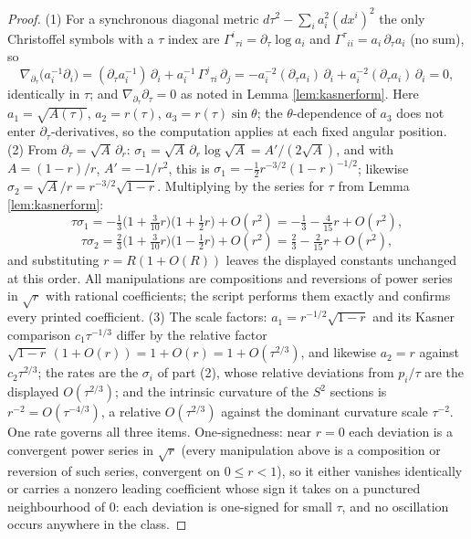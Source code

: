 \documentclass[11pt]{article}
\theoremstyle{definition}
\begin{document}
\begin{proof}
(1) For a synchronous diagonal metric $d\tau^2 - \sum_i a_i^2 (dx^i)^2$ the only Christoffel symbols with a $\tau$ index are $\Gamma^i{}_{\tau i} = \partial_\tau \log a_i$ and $\Gamma^\tau{}_{ii} = a_i\,\partial_\tau a_i$ (no sum), so
\[
\nabla_{\partial_\tau}\bigl(a_i^{-1}\partial_i\bigr)
= (\partial_\tau a_i^{-1})\,\partial_i + a_i^{-1}\,\Gamma^j{}_{\tau i}\,\partial_j
= -a_i^{-2}(\partial_\tau a_i)\,\partial_i + a_i^{-2}(\partial_\tau a_i)\,\partial_i = 0 ,
\]
identically in $\tau$; and $\nabla_{\partial_\tau}\partial_\tau = 0$ as noted in Lemma \ref{lem:kasnerform}. Here $a_1 = \sqrt{A(\tau)}$, $a_2 = r(\tau)$, $a_3 = r(\tau)\sin\theta$; the $\theta$-dependence of $a_3$ does not enter $\partial_\tau$-derivatives, so the computation applies at each fixed angular position. (2) From $\partial_\tau = \sqrt{A}\,\partial_r$: $\sigma_1 = \sqrt A\,\partial_r \log\sqrt A = A'/(2\sqrt A)$, and with $A = (1-r)/r$, $A' = -1/r^2$, this is $\sigma_1 = -\tfrac12 r^{-3/2}(1-r)^{-1/2}$; likewise $\sigma_2 = \sqrt A / r = r^{-3/2}\sqrt{1-r}$. Multiplying by the series for $\tau$ from Lemma \ref{lem:kasnerform}:
\[
\tau\sigma_1 = -\tfrac13\bigl(1 + \tfrac{3}{10}r\bigr)\bigl(1 + \tfrac12 r\bigr) + O(r^2) = -\tfrac13 - \tfrac{4}{15}r + O(r^2),
\]
\[
\tau\sigma_2 = \tfrac23\bigl(1 + \tfrac{3}{10}r\bigr)\bigl(1 - \tfrac12 r\bigr) + O(r^2) = \tfrac23 - \tfrac{2}{15}r + O(r^2),
\]
and substituting $r = R(1 + O(R))$ leaves the displayed constants unchanged at this order. All manipulations are compositions and reversions of power series in $\sqrt r$ with rational coefficients; the script performs them exactly and confirms every printed coefficient. (3) The scale factors: $a_1 = r^{-1/2}\sqrt{1-r}$ and its Kasner comparison $c_1\tau^{-1/3}$ differ by the relative factor $\sqrt{1-r}\,(1 + O(r)) = 1 + O(r) = 1 + O(\tau^{2/3})$, and likewise $a_2 = r$ against $c_2\tau^{2/3}$; the rates are the $\sigma_i$ of part (2), whose relative deviations from $p_i/\tau$ are the displayed $O(\tau^{2/3})$; and the intrinsic curvature of the $S^2$ sections is $r^{-2} = O(\tau^{-4/3})$, a relative $O(\tau^{2/3})$ against the dominant curvature scale $\tau^{-2}$. One rate governs all three items. One-signedness: near $r = 0$ each deviation is a convergent power series in $\sqrt r$ (every manipulation above is a composition or reversion of such series, convergent on $0 \le r < 1$), so it either vanishes identically or carries a nonzero leading coefficient whose sign it takes on a punctured neighbourhood of $0$: each deviation is one-signed for small $\tau$, and no oscillation occurs anywhere in the class.
\end{proof}
\end{document}
